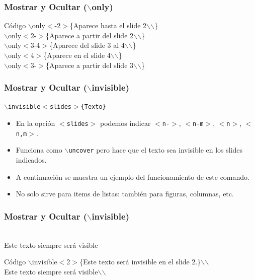 \documentclass[aspectratio=43]{beamer}%
\begin{document}
\begin{frame}[fragile]
\frametitle{\textbf{Mostrar y Ocultar ($\backslash$only)}}
\justifying
 
 
\begin{exampleblock}{Código}
$\backslash$only$<$-2$>$\{Aparece hasta el slide 2$\backslash$$\backslash$\} \\
$\backslash$only$<$2-$>$\{Aparece a partir del slide 2$\backslash$$\backslash$\}\\
$\backslash$only$<$3-4$>$\{Aparece del slide 3 al 4$\backslash$$\backslash$\}\\
$\backslash$only$<$4$>$\{Aparece en el slide 4$\backslash$$\backslash$\}\\
$\backslash$only$<$3-$>$\{Aparece a partir del slide 3$\backslash$$\backslash$\}\\
\end{exampleblock}

\end{frame}

\begin{frame}[fragile]
\frametitle{\textbf{Mostrar y Ocultar ($\backslash$invisible)}}
\justifying
   \texttt{$\backslash$invisible$<$slides$>$\{Texto\}}
 \begin{itemize}\justifying
  \item En la opción \texttt{$<$slides$>$} podemos indicar \texttt{$<$n-$>$}, \texttt{$<$n-m$>$}, \texttt{$<$n$>$}, \texttt{$<$n,m$>$}.
  \item Funciona como \texttt{$\backslash$uncover} pero hace que el texto sea invisible en los slides indicados. 
  \item A continuación se muestra un ejemplo del funcionamiento de este comando.
  \item No solo sirve para items de listas: también para figuras, columnas, etc.
\end{itemize}
\end{frame}

\begin{frame}[fragile]
\frametitle{\textbf{Mostrar y Ocultar ($\backslash$invisible)}}
\justifying
 
 \\ Este texto siempre será visible\\
 
 \begin{exampleblock}{Código}
 $\backslash$invisible$<$2$>$\{Este texto será invisible en el slide 2.\}$\backslash$$\backslash$\\
 Este texto siempre será visible$\backslash$$\backslash$
\end{exampleblock}

 
\end{frame}
\end{document}
